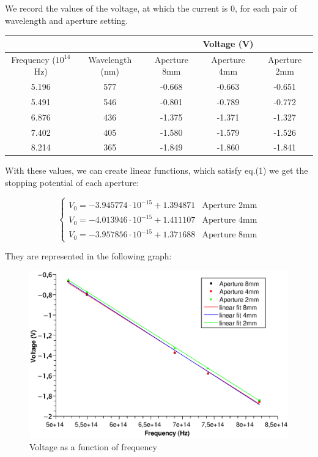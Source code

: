 \documentclass{scrartcl}
\begin{document}
We record the values of the voltage, at which the current is 0, for each pair of wavelength and aperture setting.

\begin{center}
\begin{tabular}{c|c|ccc}
     \multicolumn{2}{c|}{ } & \multicolumn{3}{c}{Voltage (V)} \\
    \hline
    Frequency ($10^{14}$ Hz) & Wavelength (nm) & Aperture 8mm & Aperture 4mm & Aperture 2mm \\\hline
    5.196 & 577 & -0.668 & -0.663 & -0.651 \\
    5.491 & 546 & -0.801 & -0.789 & -0.772 \\
    6.876 & 436 & -1.375 & -1.371 & -1.327 \\
    7.402 & 405 & -1.580 & -1.579 & -1.526 \\
    8.214 & 365 & -1.849 & -1.860 & -1.841
\end{tabular}
\end{center}

\noindent With these values, we can create linear functions, which satisfy eq.(1) we get the stopping potential of each aperture: 

\[\begin{cases}
    V_0 = -3.945774 \cdot 10^{-15} + 1.394871 & \text{Aperture 2mm} \nonumber \\
    V_0 = -4.013946 \cdot 10^{-15} + 1.411107 & \text{Aperture 4mm} \nonumber \\
    V_0 = -3.957856 \cdot 10^{-15} + 1.371688 & \text{Aperture 8mm} \nonumber
\end{cases}\]

\noindent They are represented in the following graph:

\begin{figure}[ht]
    \centering
    \includegraphics[width=14cm]{TP1_PhotoEffect_Part1_PlanckConst.eps}
    \caption{Voltage as a function of frequency}
    \label{fig:my_label}
\end{figure}
\FloatBarrier
\end{document}
